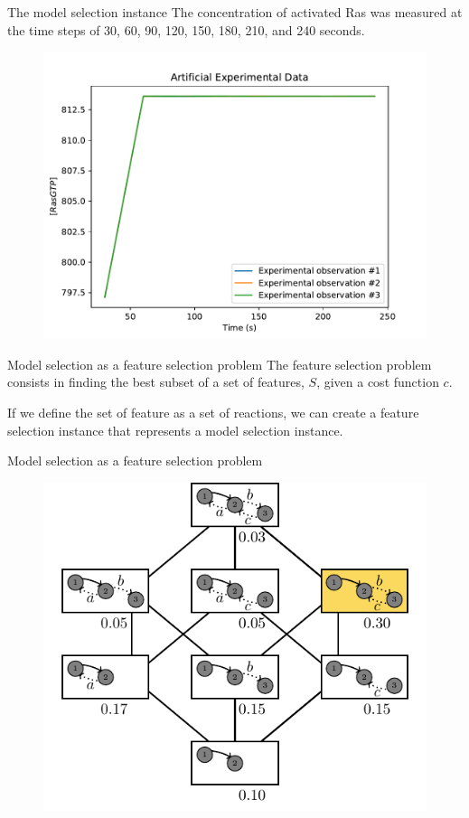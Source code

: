 \documentclass{beamer}
\begin{document}
\begin{frame}{The model selection instance}
The concentration of activated Ras was measured at the time steps of 30,
60, 90, 120, 150, 180, 210, and 240 seconds. \pause
\begin{figure}
\includegraphics[width=.80\textwidth]{experiments/ras_switch/experiment_plot.pdf}
\end{figure}
\end{frame}


\begin{frame}{Model selection as a feature selection problem}
The feature selection problem consists in finding the best subset of
a set of features, $S$, given a cost function $c$. \pause

If we define the set of feature as a set of reactions, we can create a
feature selection instance that represents a model selection
instance.
\end{frame}


\begin{frame}{Model selection as a feature selection problem}

\begin{figure}[h!]
\begin{center}
    \includegraphics[width=.8\textwidth]{experiments/Boolean_lattice_model_selection.pdf}
\end{center}
\end{figure}
\end{frame}
\end{document}
